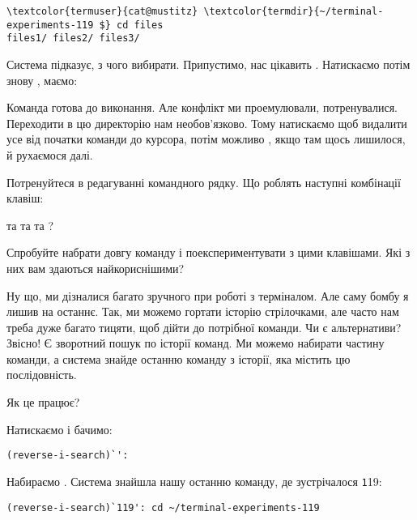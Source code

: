 \begin{Verbatim}[fontsize=\footnotesize,commandchars=\\\{\},xleftmargin=\parindent]
\textcolor{termuser}{cat@mustitz} \textcolor{termdir}{~/terminal-experiments-119 $} cd files
files1/ files2/ files3/
\end{Verbatim}

Система підказує, з чого вибирати.
Припустимо, нас цікавить .
Натискаємо  потім знову \keys{\tab}, маємо: 

Команда готова до виконання.
Але конфлікт ми проемулювали, потренувалися.
Переходити в цю директорію нам необов'язково.
Тому натискаємо  щоб видалити усе від початки команди до курсора,
потім можливо , якщо там щось лишилося, й рухаємося далі.

\begin{exercise}
Потренуйтеся в редагуванні командного рядку.
Що роблять наступні комбінації клавіш:

 та 
 та 
та \keys{\ctrl+\arrowkeyleft}?

Спробуйте набрати довгу команду і поекспериментувати з цими клавішами.
Які з них вам здаються найкориснішими?
\end{exercise}

Ну що, ми дізналися багато зручного при роботі з терміналом.
Але саму бомбу я лишив на останнє.
Так, ми можемо гортати історію стрілочками,
але часто нам треба дуже багато тицяти, щоб дійти до потрібної команди.
Чи є альтернативи?  Звісно!
Є зворотний пошук по історії команд.
Ми можемо набирати частину команди,
а система знайде останню команду з історії, яка містить цю послідовність.

Як це працює?

Натискаємо  і бачимо:
\begin{Verbatim}[fontsize=\footnotesize,commandchars=\\\{\},xleftmargin=\parindent]
(reverse-i-search)`':
\end{Verbatim}

Набираємо .
Система знайшла нашу останню команду, де зустрічалося {\texttt 119}:
\begin{Verbatim}[fontsize=\footnotesize,commandchars=\\\{\},xleftmargin=\parindent]
(reverse-i-search)`119': cd ~/terminal-experiments-119
\end{Verbatim}

